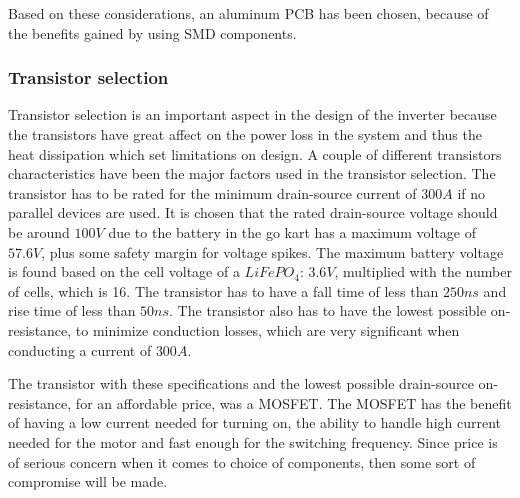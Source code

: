 Based on these considerations, an aluminum PCB has been chosen,
because of the benefits gained by using SMD components.


\subsubsection{Transistor selection}
Transistor selection is an important aspect in the design of the inverter because the transistors have great affect on the power loss in the system and thus the heat dissipation which set limitations on design. 
A couple of different transistors characteristics have been the major factors used in the transistor selection.
The transistor has to be rated for the minimum drain-source current of $300 A$ if no parallel devices are used. It is chosen that the rated drain-source voltage should be around $100 V$ due to the battery in the go kart has a maximum voltage of $57.6V$, plus some safety margin for voltage spikes. 
The maximum battery voltage is found based on the cell voltage of a $LiFePO_4$: $3.6 V$, multiplied with the number of cells, which is 16. The transistor has to have a fall time of less than $250ns$ and rise time of less than $50ns$. The transistor also has to have the lowest possible on-resistance, to minimize conduction losses, which are very significant when conducting a current of $300A$.

The transistor with these specifications and the lowest possible drain-source on-resistance, for an affordable price, was a MOSFET. The MOSFET has the benefit of having a low current needed for turning on, the ability to handle high current needed for the motor and fast enough for the switching frequency. Since price is of serious concern when it comes to choice of components, then some sort of compromise will be made. \\

